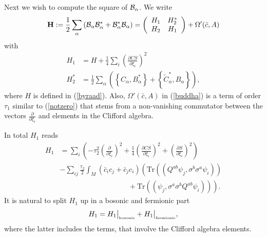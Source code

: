 \documentclass[12pt]{article}
\newcommand{\nn}{\nonumber}
\def\a{\alpha}
\def\OO{\Omega}
\def\cb{{\cal B}}
\newcommand{\pa}{\partial}
\begin{document}
Next we wish to compute the square of $\cb_\a$. We write 
\begin{eqnarray}
{\bf H}:= \frac{1}{2}\sum_\a \left( \cb_\a \cb_\a^*  + \cb_\a^* \cb_\a\right)  =
\left(
\begin{array}{cc}
H_{1}  & H^*_{2} \\
{H}_2 &  {H}_{1} 
\end{array}
\right) +  \OO'(\bar{c}, A)
\label{buddha}
\end{eqnarray}
with
\begin{align}
H_1 &= H + \frac{1}{4}  \sum_i \left( \frac{\pa CS}{\pa\xi_i} \right)^2
\nn\\
H_2^* &=  \frac{1}{2} \sum_\a  \left(  \left\{  C_\a   ,  B^*_\a    \right\}   +     \left\{  \tilde{C}_\a^*    ,   B_\a    \right\}     \right),
\end{align}
where $H$ is defined in (\ref{byraad}). Also, $ \OO'(\bar{c}, A)$ in (\ref{buddha}) is a term of order $\tau_1$ similar to (\ref{notzero}) that stems from a non-vanishing commutator between the vectors $\frac{\pa}{\pa\xi_i}$ and elements in the Clifford algebra.

 In total $H_1$ reads 
\begin{align}
H_1 &=  \sum_{i}    \left(  -\tau_2^2    \left( \frac{\pa}{\pa\xi_{i }}\right)^2     
+ \frac{1}{4}  \left( \frac{\pa CS}{\pa\xi_i} \right)^2  + \left( \frac{\pa S}{\pa \xi_i}\right)^2  \right)
\nn\\&
- \sum_{ij} \frac{\tau_2}{2}      \int_M \left( \bar{c}_i   {c}_{j} + \bar{c}_j   {c}_{i}  \right)  
\left( \mbox{Tr} \left(    (Q^{ab}\psi_j,  \sigma^b \sigma^a \psi_i)  \right) 
\right. \nn\\ &\left.\hspace{4cm}
+  \mbox{Tr} \left(     (\psi_j,  \sigma^a  \sigma^b Q ^{ab} \psi_i)   \right) \right).
\label{NewYork}
\end{align}
It is natural to split $H_1$ up in a bosonic and fermionic part
\begin{equation}
H_1 = H_1 \big\vert_{\mbox{\tiny bosonic}} + H_1\big\vert_{\mbox{\tiny fermionic}},
\label{Pl1}
\end{equation}
where the latter includes the terms, that involve the Clifford algebra elements.
\end{document}
